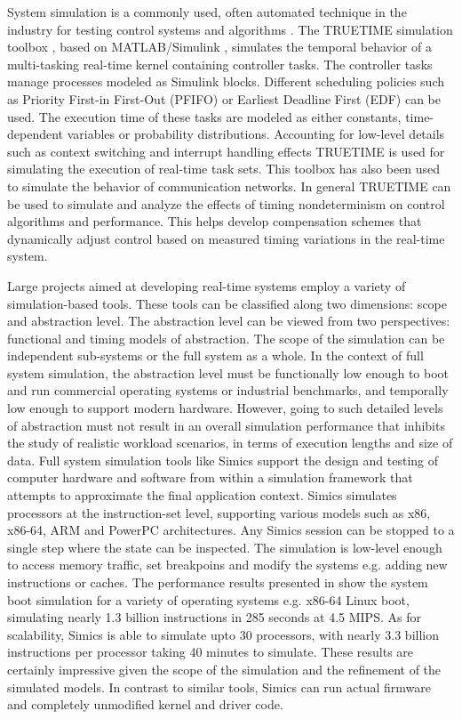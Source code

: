 System simulation is a commonly used, often automated technique in the industry for testing control systems and algorithms \cite{henriksson2003truetime, kim1994simulation}. The TRUETIME simulation toolbox \cite{henriksson2002truetime}, based on MATLAB/Simulink \cite{simulink1993mathworks}, simulates the temporal behavior of a multi-tasking real-time kernel containing controller tasks. The controller tasks manage processes modeled as Simulink blocks. Different scheduling policies such as Priority First-in First-Out (PFIFO) or Earliest Deadline First (EDF) can be used. The execution time of these tasks are modeled as either constants, time-dependent variables or probability distributions. Accounting for low-level details such as context switching and interrupt handling effects TRUETIME is used for simulating the execution of real-time task sets. This toolbox has also been used to simulate the behavior of communication networks. In general TRUETIME can be used to simulate and analyze the effects of timing nondeterminism on control algorithms and performance. This helps develop compensation schemes that dynamically adjust control based on measured timing variations in the real-time system. 

Large projects aimed at developing real-time systems employ a variety of simulation-based tools. These tools can be classified along two dimensions: scope and abstraction level. The abstraction level can be viewed from two perspectives: functional and timing models of abstraction. The scope of the simulation can be independent sub-systems or the full system as a whole. In the context of full system simulation, the abstraction level must be functionally low enough to boot and run commercial operating systems or industrial benchmarks, and temporally low enough to support modern hardware. However, going to such detailed levels of abstraction must not result in an overall simulation performance that inhibits the study of realistic workload scenarios, in terms of execution lengths and size of data. Full system simulation tools like Simics \cite{magnusson2002simics} support the design and testing of computer hardware and software from within a simulation framework that attempts to approximate the final application context. Simics simulates processors at the instruction-set level, supporting various models such as x86, x86-64, ARM and PowerPC architectures. Any Simics session can be stopped to a single step where the state can be inspected. The simulation is low-level enough to access memory traffic, set breakpoins and modify the systems e.g. adding new instructions or caches. The performance results presented in \cite{magnusson2002simics} show the system boot simulation for a variety of operating systems e.g. x86-64 Linux boot, simulating nearly 1.3 billion instructions in 285 seconds at 4.5 MIPS. As for scalability, Simics is able to simulate upto 30 processors, with nearly 3.3 billion instructions per processor taking 40 minutes to simulate. These results are certainly impressive given the scope of the simulation and the refinement of the simulated models. In contrast to similar tools, Simics can run actual firmware and completely unmodified kernel and driver code.

